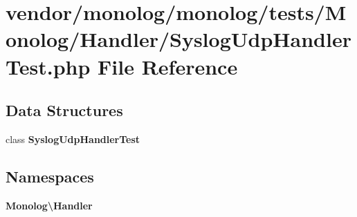 \section{vendor/monolog/monolog/tests/\+Monolog/\+Handler/\+Syslog\+Udp\+Handler\+Test.php File Reference}
\label{_syslog_udp_handler_test_8php}
\subsection*{Data Structures}
\begin{DoxyCompactItemize}
\item 
class {\bf Syslog\+Udp\+Handler\+Test}
\end{DoxyCompactItemize}
\subsection*{Namespaces}
\begin{DoxyCompactItemize}
\item 
 {\bf Monolog\textbackslash{}\+Handler}
\end{DoxyCompactItemize}

